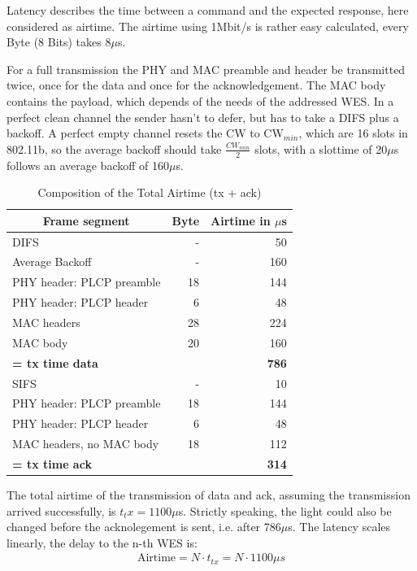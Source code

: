 Latency describes the time between a command and the expected response, here considered as airtime.
The airtime using 1Mbit/s is rather easy calculated, every Byte (8 Bits) takes 8$\mu$s.

For a full transmission the PHY and MAC preamble and header be transmitted twice, once for the data and once for the acknowledgement.
The MAC body contains the payload, which depends of the needs of the addressed \ac{WES}.
In a perfect clean channel the sender hasn't to defer, but has to take a \ac{DIFS} plus a backoff.
A perfect empty channel resets the CW to CW$_{min}$, which are 16 slots in 802.11b,
so the average backoff should take $\frac{CW_{min}}{2}$ slots, with a slottime of 20$\mu$s follows an average backoff of 160$\mu$s.

\begin{table}[h]
	\centering
	\begin{tabular} { lrr }
		\toprule
		\multicolumn{1}{c}{Frame segment}
		& \multicolumn{1}{c}{Byte}
		& \multicolumn{1}{c}{Airtime in $\mu$s} \\
		\midrule
		DIFS								& -		& 50 \\
		Average Backoff						& -		& 160 \\
		PHY header: PLCP preamble			& 18	& 144 \\
		PHY header: PLCP header				& 6 	& 48 \\
		MAC headers							& 28	& 224 \\
		MAC body							& 20 	& 160 \\
		\textbf{= tx time data}				& 		& \textbf{786} \\
		SIFS								& -		& 10 \\
		PHY header: PLCP preamble			& 18	& 144 \\
		PHY header: PLCP header				& 6		& 48 \\
		MAC headers, no MAC body	 		& 18	& 112 \\
		\textbf{= tx time ack}				& 		& \textbf{314} \\
		\bottomrule
	\end{tabular}
	\caption{Composition of the Total Airtime (tx + ack)}
	\label{tab:airtime_unicast_calc}
\end{table}

The total airtime of the transmission of data and ack, assuming the transmission arrived successfully, is $t_tx=1100\mu$s.
Strictly speaking, the light could also be changed before the acknolegement is sent, i.e. after 786$\mu$s.
The latency scales linearly, the delay to the n-th WES is:
\begin{align}
	\text{Airtime} = N \cdot t_{tx} = N \cdot 1100\mu s
\end{align}

